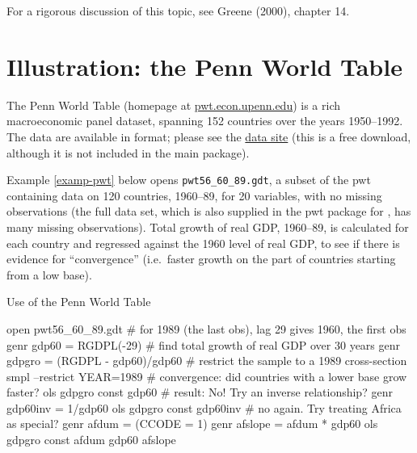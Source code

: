For a rigorous discussion of this topic, see Greene (2000), chapter
14.

\section{Illustration: the Penn World Table}
\label{PWT}

The Penn World Table (homepage at
\href{http://pwt.econ.upenn.edu/}{pwt.econ.upenn.edu}) is a rich
macroeconomic panel dataset, spanning 152 countries over the years
1950--1992.  The data are available in  format; please see
the 
\href{http://gretl.sourceforge.net/gretl_data.html}{data site} (this
is a free download, although it is not included in the main
 package).

Example \ref{examp-pwt} below opens \verb+pwt56_60_89.gdt+, a subset
of the pwt containing data on 120 countries, 1960--89, for 20
variables, with no missing observations (the full data set, which is
also supplied in the pwt package for , has many missing
observations). Total growth of real GDP, 1960--89, is calculated for
each country and regressed against the 1960 level of real GDP, to see
if there is evidence for ``convergence'' (i.e.\ faster growth on the
part of countries starting from a low base).

\begin{script}[htbp]
  \caption{Use of the Penn World Table}
  \label{examp-pwt}

\begin{code}
          open pwt56_60_89.gdt 
          # for 1989 (the last obs), lag 29 gives 1960, the first obs 
          genr gdp60 = RGDPL(-29) 
          # find total growth of real GDP over 30 years
          genr gdpgro = (RGDPL - gdp60)/gdp60
          # restrict the sample to a 1989 cross-section 
          smpl --restrict YEAR=1989 
          # convergence: did countries with a lower base grow faster?  
          ols gdpgro const gdp60 
          # result: No! Try an inverse relationship?
          genr gdp60inv = 1/gdp60 
          ols gdpgro const gdp60inv 
          # no again.  Try treating Africa as special? 
          genr afdum = (CCODE = 1)
          genr afslope = afdum * gdp60 
          ols gdpgro const afdum gdp60 afslope 
\end{code}
\end{script}



